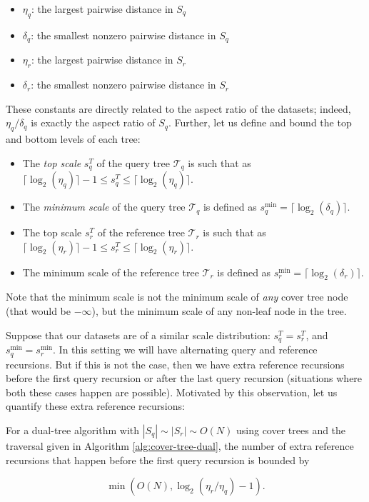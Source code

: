 \begin{itemize}
  \item $\eta_q$: the largest pairwise distance in $S_q$
  \item $\delta_q$: the smallest nonzero pairwise distance in $S_q$
  \item $\eta_r$: the largest pairwise distance in $S_r$
  \item $\delta_r$: the smallest nonzero pairwise distance in $S_r$
\end{itemize}

These constants are directly related to the aspect ratio of the datasets;
indeed, $\eta_q / \delta_q$ is exactly the aspect ratio of $S_q$.  Further,
let us define and bound the top and bottom levels of each tree:

\begin{itemize}
  \item The {\it top scale} $s_q^T$ of the query tree $\mathscr{T}_q$ is such
that as $\lceil \log_2(\eta_q) \rceil - 1 \le s_q^T \le \lceil \log_2(\eta_q)
\rceil$.
  \item The {\it minimum scale} of the query tree $\mathscr{T}_q$ is defined as
$s_q^{\min} = \lceil \log_2(\delta_q) \rceil$.
  \item The top scale $s_r^T$ of the reference tree $\mathscr{T}_r$ is such that
as $\lceil \log_2(\eta_r) \rceil - 1 \le s_r^T \le \lceil \log_2(\eta_r)
\rceil$.
  \item The minimum scale of the reference tree $\mathscr{T}_r$ is defined as
$s_r^{\min} = \lceil \log_2(\delta_r) \rceil$.
\end{itemize}

Note that the minimum scale is not the minimum scale of {\it any} cover tree
node (that would be $-\infty$), but the minimum scale of any non-leaf node in
the tree.

Suppose that our datasets are of a similar scale distribution: $s_q^T = s_r^T$,
and $s_q^{\min} = s_r^{\min}$.  In this setting we will have alternating query
and reference recursions.  But if this is not the case, then we have extra
reference recursions before the first query recursion or after the last query
recursion (situations where both these cases happen are possible).  Motivated by
this observation, let us quantify these extra reference recursions:

\begin{lemma}
\label{lem:extcase1}
For a dual-tree algorithm with $|S_q| \sim |S_r| \sim O(N)$ using cover trees and
the traversal given in Algorithm \ref{alg:cover-tree-dual}, the number of extra
reference recursions that happen before the first query recursion is bounded by

\begin{equation}
\min\left(O(N), \log_2(\eta_r / \eta_q) - 1\right).
\end{equation}
\end{lemma}

